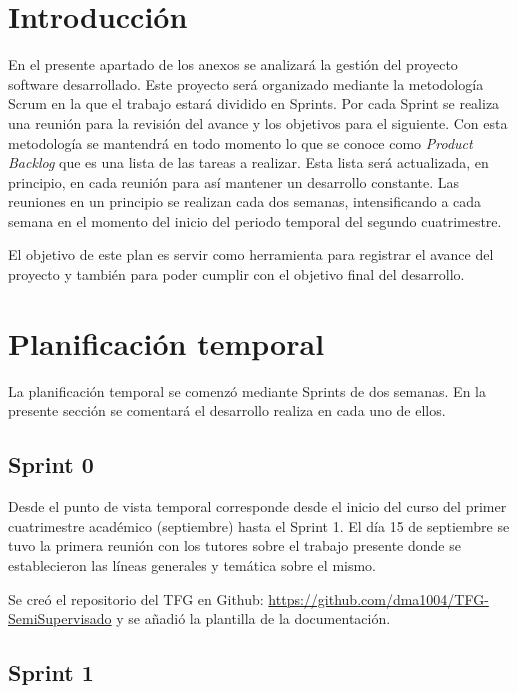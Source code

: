 
\section{Introducción}

En el presente apartado de los anexos se analizará la gestión del proyecto
software desarrollado. Este proyecto será organizado mediante la metodología
Scrum en la que el trabajo estará dividido en Sprints. Por cada Sprint se
realiza una reunión para la revisión del avance y los objetivos para el
siguiente.  Con esta metodología se mantendrá en todo momento lo que se conoce
como \textit{Product Backlog} que es una lista de las tareas a realizar. Esta
lista será actualizada, en principio, en cada reunión para así mantener un
desarrollo constante. Las reuniones en un principio se realizan cada dos
semanas, intensificando a cada semana en el momento del inicio del periodo
temporal del segundo cuatrimestre.

El objetivo de este plan es servir como herramienta para registrar el avance del
proyecto y también para poder cumplir con el objetivo final del desarrollo.


\section{Planificación temporal}
La planificación temporal se comenzó mediante Sprints de dos semanas. En la
presente sección se comentará el desarrollo realiza en cada uno de ellos.

\subsection{Sprint 0}

Desde el punto de vista temporal corresponde desde el inicio del curso del
primer cuatrimestre académico (septiembre) hasta el Sprint 1. El día 15 de
septiembre se tuvo la primera reunión con los tutores sobre el trabajo presente
donde se establecieron las líneas generales y temática sobre el mismo.

Se creó el repositorio del TFG en Github:
\url{https://github.com/dma1004/TFG-SemiSupervisado} y se añadió la plantilla de
la documentación.

\subsection{Sprint 1}

